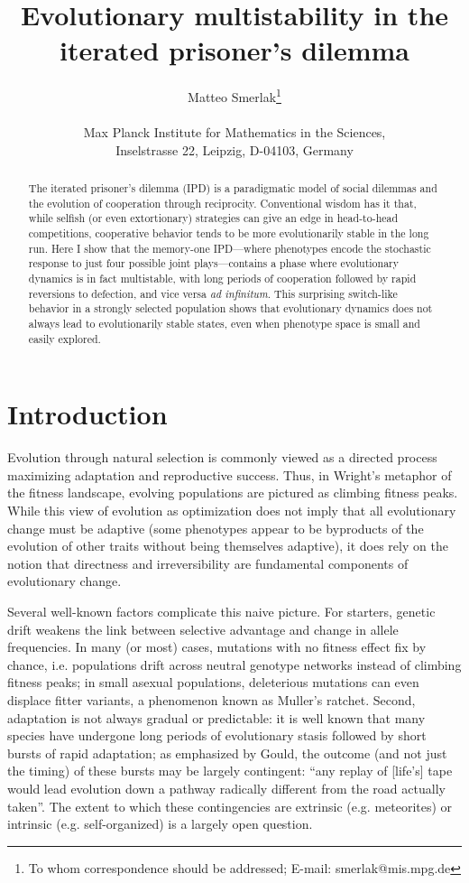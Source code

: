 \documentclass[12pt]{article}
\title{Evolutionary multistability in the iterated prisoner's dilemma}
\author
{Matteo Smerlak\footnote{To whom correspondence should be addressed; E-mail:  smerlak@mis.mpg.de}\\
\\
\normalsize{Max Planck Institute for Mathematics in the Sciences,}\\
\normalsize{Inselstrasse 22, Leipzig, D-04103, Germany}\\
}
\date{}
\begin{document}
\maketitle

\begin{abstract}
The iterated prisoner's dilemma (IPD) is a paradigmatic model of social dilemmas and the evolution of cooperation through reciprocity. Conventional wisdom has it that, while selfish (or even extortionary) strategies can give an edge in head-to-head competitions, cooperative behavior tends to be more evolutionarily stable in the long run. Here I show that the memory-one IPD---where phenotypes encode the stochastic response to just four possible joint plays---contains a phase where evolutionary dynamics is in fact multistable, with long periods of cooperation followed by rapid reversions to defection, and vice versa \emph{ad infinitum}. This surprising switch-like behavior in a strongly selected population shows that evolutionary dynamics does not always lead to evolutionarily stable states, even when phenotype space is small and easily explored. 
\end{abstract}

\section*{Introduction}

Evolution through natural selection is commonly viewed as a directed process  maximizing adaptation and reproductive success. Thus, in Wright's metaphor of the fitness landscape, evolving populations are pictured as climbing fitness peaks. While this view of evolution as optimization does not imply that all evolutionary change must be adaptive (some phenotypes appear to be byproducts of the evolution of other traits without being themselves adaptive), it does rely on the notion that directness and irreversibility are fundamental components of evolutionary change.  

Several well-known factors complicate this naive picture. For starters, genetic drift weakens the link between selective advantage and change in allele frequencies. In many (or most) cases, mutations with no fitness effect fix by chance, i.e. populations drift across neutral genotype networks instead of climbing fitness peaks; in small asexual populations, deleterious mutations can even displace fitter variants, a phenomenon known as Muller's ratchet. Second, adaptation is not always gradual or predictable: it is well known that many species have undergone long periods of evolutionary stasis followed by short bursts of rapid adaptation; as emphasized by Gould, the outcome (and not just the timing) of these bursts may be largely contingent: ``any replay of [life's] tape would lead evolution down a pathway radically different from the road actually taken''. The extent to which these contingencies are extrinsic (e.g. meteorites) or intrinsic (e.g. self-organized) is a largely open question. 
\end{document}
